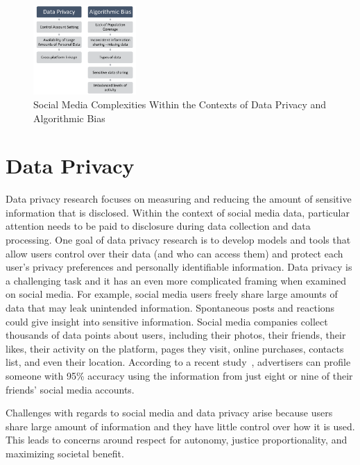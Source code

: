 \documentclass[11pt]{article} %
\begin{document}
\begin{figure}[tb]
    \centering
        \includegraphics[width=0.35\textwidth]{figs/sm-challenges2.png}
    \caption{Social Media Complexities Within the Contexts of Data Privacy and Algorithmic Bias}
    \label{fig:framing}
\end{figure}
\section{Data Privacy} 
\label{sec:privacy} 
Data privacy research focuses on measuring and reducing the amount of sensitive information that is disclosed. Within the context of social media data, particular attention needs to be paid to disclosure during data collection and data processing. One goal of data privacy research is to develop models and tools that allow users control over their data (and who can access them) and protect each user's privacy preferences and personally identifiable information. Data privacy is a challenging task and it has an even more complicated framing when examined on social media.
For example, social media users freely share large amounts of data that may leak unintended information.  Spontaneous posts and reactions could give insight into sensitive information. Social media companies collect thousands of data points about users, including their photos, their friends, their likes, their activity on the platform,  pages they visit, online purchases, contacts list, and even their location. According to a recent study~\cite{bagrow2019}, advertisers can profile someone with 95\% accuracy using the information from just eight or nine of their friends’ social media accounts. 

Challenges with regards to social media and data privacy arise because users share large amount of information and they have little control over how it is used. This leads to concerns around respect for autonomy, justice proportionality, and maximizing societal benefit.
\end{document}
